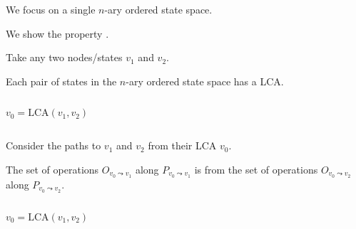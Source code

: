 
\begin{frame}{}
  \centerline{}
\end{frame}

\begin{frame}{}
  \begin{center}
    {\large We focus on a single $n$-ary ordered state space.}
  \end{center}


  \begin{center}
    {\large We show the  property .}
  \end{center}
\end{frame}

\begin{frame}{}
  \centerline{ Take any two nodes/states $v_1$ and $v_2$.}

  \begin{lemma}
    Each pair of states in the $n$-ary ordered state space has a  LCA.
  \end{lemma}

  \begin{columns}
	\[
	  v_0 = \text{LCA}(v_1, v_2)
	\]
  \end{columns}
\end{frame}

\begin{frame}{}
  \centerline{ Consider the paths to $v_1$ and $v_2$ from their LCA $v_0$.}

  \begin{lemma}
    The set of operations $O_{v_0 \leadsto v_1}$ along $P_{v_0 \leadsto v_1}$ 
    is  from the set of operations $O_{v_0 \leadsto v_2}$ along $P_{v_0 \leadsto v_2}$.
  \end{lemma}

  \begin{columns}
	\[
	  v_0 = \text{LCA}(v_1, v_2)
	\]
  \end{columns}
\end{frame}

